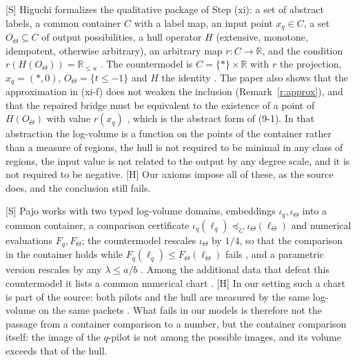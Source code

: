 \documentclass[11pt]{article}
\theoremstyle{plain}
\theoremstyle{definition}
\theoremstyle{remark}
\newcommand{\Smark}{\textup{[S]}}
\newcommand{\Hmark}{\textup{[H]}}
\begin{document}
\Smark{} Higuchi \cite{Higuchi} formalizes the qualitative package of Step (xi): a set of
abstract labels, a common container $C$ with a label map, an input point $x_q\in C$, a set
$O_\Theta\subseteq C$ of output possibilities, a hull operator $H$ (extensive, monotone,
idempotent, otherwise arbitrary), an arbitrary map $r\colon C\to\mathbb R$, and the condition
$r(H(O_\Theta))=\mathbb R_{\le u}$ \cite[Def.~3.1]{Higuchi}. The countermodel is
$C=\{\ast\}\times\mathbb R$ with $r$ the projection, $x_q=(\ast,0)$,
$O_\Theta=\{t\le-1\}$ and $H$ the identity \cite[Thm.~5.1]{Higuchi}. The paper also shows
that the approximation in (xi-f) does not weaken the inclusion (Remark~\ref{r:approx}), and
that the repaired bridge must be equivalent to the existence of a point of $H(O_\Theta)$
with value $r(x_q)$ \cite[Prop.~6.1]{Higuchi}, which is the abstract form of (9-1). In that
abstraction the log-volume is a function on the points of the container rather than a
measure of regions, the hull is not required to be minimal in any class of regions, the
input value is not related to the output by any degree scale, and it is not required to be
negative. \Hmark{} Our axioms impose all of these, as the source does, and the conclusion
still fails.

\Smark{} Pajo \cite{Pajo} works with two typed log-volume domains, embeddings
$\iota_q,\iota_\Theta$ into a common container, a comparison certificate
$\iota_q(\ell_q)\preceq_C\iota_\Theta(\ell_\Theta)$ and numerical evaluations
$F_q,F_\Theta$; the countermodel rescales $\iota_\Theta$ by $1/4$, so that the comparison
in the container holds while $F_q(\ell_q)\le F_\Theta(\ell_\Theta)$ fails
\cite[Thm.~6.1, \S7]{Pajo}, and a parametric version rescales by any $\lambda\le a/b$
\cite[Thm.~9.1]{Pajo}. Among the additional data that defeat this countermodel it lists a
common numerical chart \cite[\S11.1]{Pajo}. \Hmark{} In our setting such a chart is part
of the source: both pilots and the hull are measured by the same log-volume on the same packets
\cite[Prop.~3.9]{IUT3}. What fails in our models is therefore not the passage from a
container comparison to a number, but the container comparison itself: the image of the
$q$-pilot is not among the possible images, and its volume exceeds that of the hull.
\end{document}
